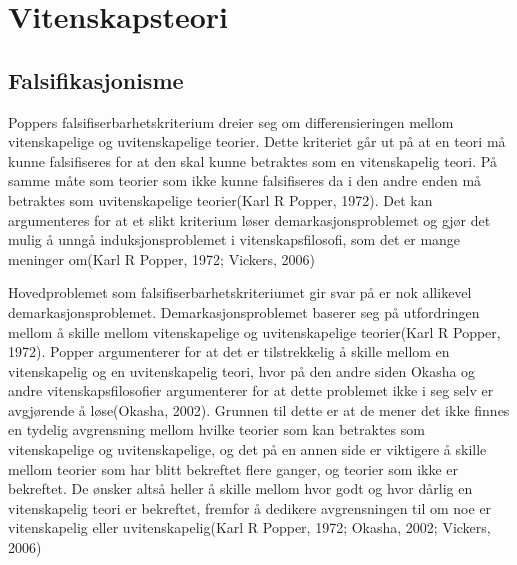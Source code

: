\documentclass[
]{book}
\begin{document}
\hypertarget{vitenskapsteori}{%
\chapter{Vitenskapsteori}\label{vitenskapsteori}}

\hypertarget{falsifikasjonisme}{%
\section{Falsifikasjonisme}\label{falsifikasjonisme}}

Poppers falsifiserbarhetskriterium dreier seg om differensieringen mellom vitenskapelige og uvitenskapelige teorier. Dette kriteriet går ut på at en teori må kunne falsifiseres for at den skal kunne betraktes som en vitenskapelig teori. På samme måte som teorier som ikke kunne falsifiseres da i den andre enden må betraktes som uvitenskapelige teorier(Karl R Popper, 1972). Det kan argumenteres for at et slikt kriterium løser demarkasjonsproblemet og gjør det mulig å unngå induksjonsproblemet i vitenskapsfilosofi, som det er mange meninger om(Karl R Popper, 1972; Vickers, 2006)

Hovedproblemet som falsifiserbarhetskriteriumet gir svar på er nok allikevel demarkasjonsproblemet. Demarkasjonsproblemet baserer seg på utfordringen mellom å skille mellom vitenskapelige og uvitenskapelige teorier(Karl R Popper, 1972). Popper argumenterer for at det er tilstrekkelig å skille mellom en vitenskapelig og en uvitenskapelig teori, hvor på den andre siden Okasha og andre vitenskapsfilosofier argumenterer for at dette problemet ikke i seg selv er avgjørende å løse(Okasha, 2002). Grunnen til dette er at de mener det ikke finnes en tydelig avgrensning mellom hvilke teorier som kan betraktes som vitenskapelige og uvitenskapelige, og det på en annen side er viktigere å skille mellom teorier som har blitt bekreftet flere ganger, og teorier som ikke er bekreftet. De ønsker altså heller å skille mellom hvor godt og hvor dårlig en vitenskapelig teori er bekreftet, fremfor å dedikere avgrensningen til om noe er vitenskapelig eller uvitenskapelig(Karl R Popper, 1972; Okasha, 2002; Vickers, 2006)
\end{document}
